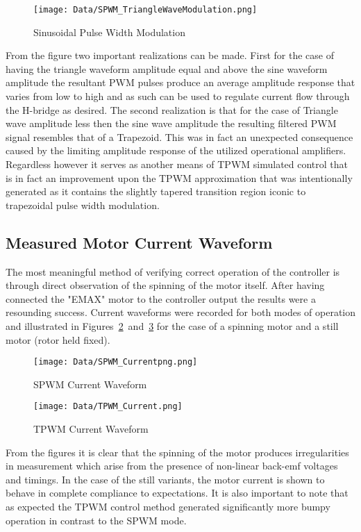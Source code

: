 \documentclass[12pt]{article}
\begin{document}
\begin{figure}[H]
\centering
\caption{Sinusoidal Pulse Width Modulation}
\texttt{[image: Data/SPWM\_TriangleWaveModulation.png]}
\label{SPWM_TriangleWaveModulation}
\end{figure}

From the figure two important realizations can be made. First for the case of having the triangle waveform amplitude equal and above the sine waveform amplitude the resultant PWM pulses produce an average amplitude response that varies from low to high and as such can be used to regulate current flow through the H-bridge as desired. The second realization is that for the case of Triangle wave amplitude less then the sine wave amplitude the resulting filtered PWM signal resembles that of a Trapezoid. This was in fact an unexpected consequence caused by the limiting amplitude response of the utilized operational amplifiers. Regardless however it serves as another means of TPWM simulated control that is in fact an improvement upon the TPWM approximation that was intentionally generated as it contains the slightly tapered transition region iconic to trapezoidal pulse width modulation.
\subsection{Measured Motor Current Waveform}%

The most meaningful method of verifying correct operation of the controller is through direct observation of the spinning of the motor itself. After having connected the "EMAX" motor to the controller output the results were a resounding success. Current waveforms were recorded for both modes of operation and illustrated in Figures~\ref{SPWM_Currentpng}~and~\ref{TPWM_Current} for the case of a spinning motor and a still motor (rotor held fixed).

\begin{figure}[H]
\centering
\caption{SPWM Current Waveform}
\texttt{[image: Data/SPWM\_Currentpng.png]}
\label{SPWM_Currentpng}
\end{figure}

\begin{figure}[H]
\centering
\caption{TPWM Current Waveform}
\texttt{[image: Data/TPWM\_Current.png]}
\label{TPWM_Current}
\end{figure}

From the figures it is clear that the spinning of the motor produces irregularities in measurement which arise from the presence of non-linear back-emf voltages and timings. In the case of the still variants, the motor current is shown to behave in complete compliance to expectations. It is also important to note that as expected the TPWM control method generated significantly more bumpy operation in contrast to the SPWM mode.
\pagebreak
\end{document}
